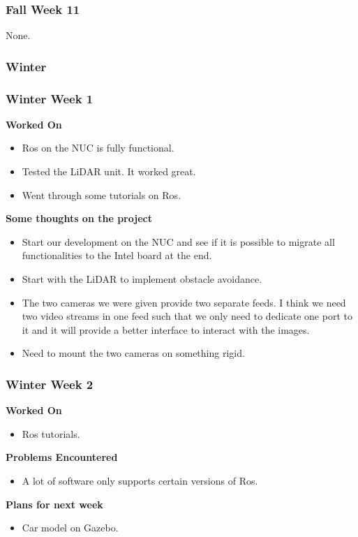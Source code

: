 \documentclass[compsoc,draftclsnofoot,onecolumn,10pt]{IEEEtran}
\begin{document}
\subsubsection*{Fall Week 11}
None.


\subsubsection{Winter}

\subsubsection*{Winter Week 1}
\textbf{Worked On}
\begin{itemize}
  \item Ros on the NUC is fully functional.
  \item Tested the LiDAR unit. It worked great.
  \item Went through some tutorials on Ros.
\end{itemize}
\textbf{Some thoughts on the project}
\begin{itemize}
  \item Start our development on the NUC and see if it is possible to
  migrate all functionalities to the Intel board at the end.
  \item Start with the LiDAR to implement obstacle avoidance.
  \item The two cameras we were given provide two separate feeds. I
  think we need two video streams in one feed such that we only need to
  dedicate one port to it and it will provide a better interface to
  interact with the images.
  \item Need to mount the two cameras on something rigid.
\end{itemize}


\subsubsection*{Winter Week 2}
\textbf{Worked On}
\begin{itemize}
  \item Ros tutorials.
\end{itemize}
\textbf{Problems Encountered}
\begin{itemize}
  \item A lot of software only supports certain versions of Ros.
\end{itemize}
\textbf{Plans for next week}
\begin{itemize}
  \item Car model on Gazebo.
\end{itemize}
\end{document}
